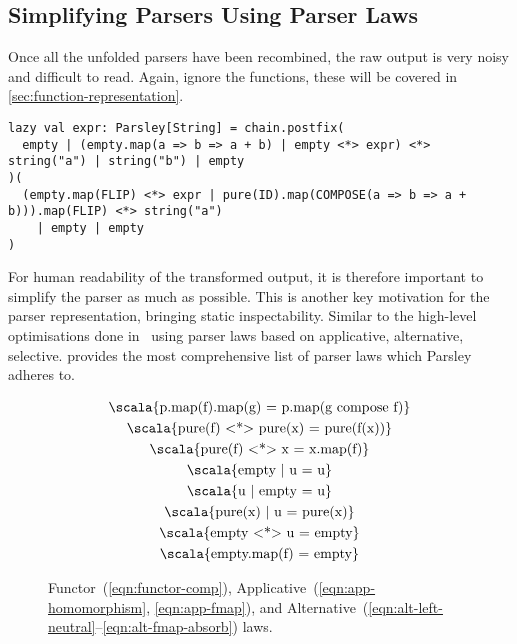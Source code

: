 \documentclass[../../main.tex]{subfiles}
\begin{document}
\subsection{Simplifying Parsers Using Parser Laws}
Once all the unfolded parsers have been recombined, the raw output is very noisy and difficult to read.
Again, ignore the functions, these will be covered in \cref{sec:function-representation}.
\begin{verbatim}
lazy val expr: Parsley[String] = chain.postfix(
  empty | (empty.map(a => b => a + b) | empty <*> expr) <*> string("a") | string("b") | empty
)(
  (empty.map(FLIP) <*> expr | pure(ID).map(COMPOSE(a => b => a + b))).map(FLIP) <*> string("a")
    | empty | empty
)
\end{verbatim}
%
For human readability of the transformed output, it is therefore important to simplify the parser as much as possible.
This is another key motivation for the parser representation, bringing static inspectability.
Similar to the high-level optimisations done in~\cite{willis_staged_2023} using parser laws based on applicative, alternative, selective.
\textcite{willis_parsley_2023} provides the most comprehensive list of parser laws which Parsley adheres to.

\begin{figure}[htbp]
\centering
\begin{gather}
  \text{\scala{p.map(f).map(g) = p.map(g compose f)}} \label{eqn:functor-comp} \\
  \text{\scala{pure(f) <*> pure(x) = pure(f(x))}} \label{eqn:app-homomorphism} \\
  \text{\scala{pure(f) <*> x = x.map(f)}} \label{eqn:app-fmap} \\
  \text{\scala{empty | u = u}} \label{eqn:alt-left-neutral} \\
  \text{\scala{u | empty = u}} \label{eqn:alt-right-neutral} \\
  \text{\scala{pure(x) | u = pure(x)}} \label{eqn:alt-left-biased-choice} \\
  \text{\scala{empty <*> u = empty}} \label{eqn:alt-empty-absorb} \\
  \text{\scala{empty.map(f) = empty}} \label{eqn:alt-fmap-absorb}
\end{gather}
\caption{Functor~(\ref{eqn:functor-comp}), Applicative~(\ref{eqn:app-homomorphism}, \ref{eqn:app-fmap}), and Alternative~(\ref{eqn:alt-left-neutral}--\ref{eqn:alt-fmap-absorb}) laws.}
\label{fig:parser-laws}
\end{figure}
\end{document}
